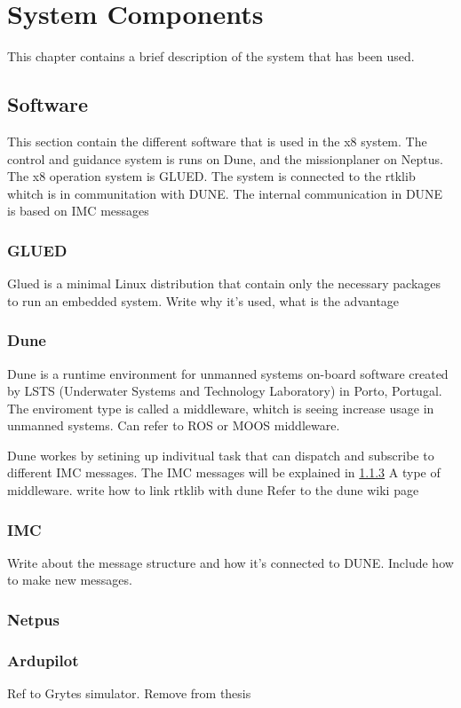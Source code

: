 
\chapter{System Components}
This chapter contains a brief description of the system that has been used.
\section{Software}
This section contain the different software that is used in the x8 system. The control and guidance system is runs on Dune, and the missionplaner on Neptus. The x8 operation system is GLUED. The system is connected to the rtklib whitch is in communitation with DUNE. The internal communication in DUNE is based on IMC messages
\subsection{GLUED}
Glued is a minimal Linux distribution that contain only the necessary packages to run an embedded system. Write why it's used, what is the advantage
\subsection{Dune}
Dune is a runtime environment for unmanned systems on-board software created by LSTS (Underwater Systems and Technology Laboratory) in Porto, Portugal. The enviroment type is called a middleware, whitch is seeing increase usage in unmanned systems. Can refer to ROS or MOOS middleware.

Dune workes by setining up indivitual task that can dispatch and subscribe to different IMC messages. The IMC messages will be explained in \ref{ss:IMC}
A type of middleware. write how to link rtklib with dune
Refer to the dune wiki page
\subsection{IMC}\label{ss:IMC}
Write about the message structure and how it's connected to DUNE. Include how to make new messages.
\subsection{Netpus}
\subsection{Ardupilot}
Ref to Grytes simulator. Remove from thesis
